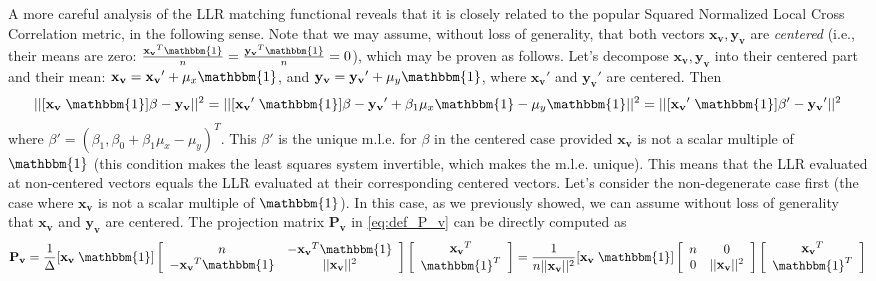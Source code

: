 A more careful analysis of the LLR matching functional reveals that it is closely related to the popular Squared Normalized Local Cross Correlation metric, in the following sense. Note that we may assume, without loss of generality, that both vectors $\mathbf{x_{v}}, \mathbf{y_{v}}$ are \emph{centered} (i.e., their means are zero: $\frac{\mathbf{x_{v}}^{T}\mathbbm{1}}{n} = \frac{\mathbf{y_{v}}^{T}\mathbbm{1}}{n} = 0$), which may be proven as follows. Let's decompose $\mathbf{x_{v}}, \mathbf{y_{v}}$ into their centered part and their mean: $\mathbf{x_{v}} = \mathbf{x_{v}}' + \mu_{x}\mathbbm{1}$, and $\mathbf{y_{v}} = \mathbf{y_{v}}' + \mu_{y}\mathbbm{1}$, where $\mathbf{x_{v}}'$ and $\mathbf{y_{v}}'$ are centered. Then
\begin{displaymath}
    ||[\mathbf{x_{v}} \; \mathbbm{1}]\beta - \mathbf{y_{v}}||^{2} = ||[\mathbf{x_{v}}' \; \mathbbm{1}]\beta - \mathbf{y_{v}}' + \beta_{1}\mu_{x}\mathbbm{1} - \mu_{y}\mathbbm{1}||^{2} = ||[\mathbf{x_{v}}' \; \mathbbm{1}]\beta' - \mathbf{y_{v}}'||^{2}
\end{displaymath}
where $\beta' = (\beta_{1}, \beta_{0} + \beta_{1}\mu_{x} - \mu_{y})^{T}$. This $\beta'$ is the unique m.l.e. for $\beta$ in the centered case provided $\mathbf{x_{v}}$ is not a scalar multiple of $\mathbbm{1}$ (this condition makes the least squares system invertible, which makes the m.l.e. unique). This means that the LLR evaluated at non-centered vectors equals the LLR evaluated at their corresponding centered vectors. Let's consider the non-degenerate case first (the case where $\mathbf{x_{v}}$ is not a scalar multiple of $\mathbbm{1}$). In this case, as we previously showed, we can assume without loss of generality that $\mathbf{x_{v}}$ and $\mathbf{y_{v}}$ are centered. The projection matrix $\mathbf{P_{v}}$ in \eqref{eq:def_P_v} can be directly computed as
\begin{equation}\label{eq:projection_formula}
    \mathbf{P_{v}} = \frac{1}{\Delta}
    [\mathbf{x_{v}} \; \mathbbm{1}]
    \left[\begin{array}{cc}
        n & - \mathbf{x_{v}}^{T}\mathbbm{1}\\
        -\mathbf{x_{v}}^{T}\mathbbm{1} & ||\mathbf{x_{v}}||^{2}
    \end{array}\right]
    \left[\begin{array}{c}
        \mathbf{x_{v}}^{T}\\
        \mathbbm{1}^{T}
    \end{array}\right] =
    \frac{1}{n||\mathbf{x_{v}}||^{2}}
    [\mathbf{x_{v}} \; \mathbbm{1}]
    \left[\begin{array}{cc}
        n & 0\\
        0 & ||\mathbf{x_{v}}||^{2}
    \end{array}\right]
    \left[\begin{array}{c}
        \mathbf{x_{v}}^{T}\\
        \mathbbm{1}^{T}
    \end{array}\right]
\end{equation}
